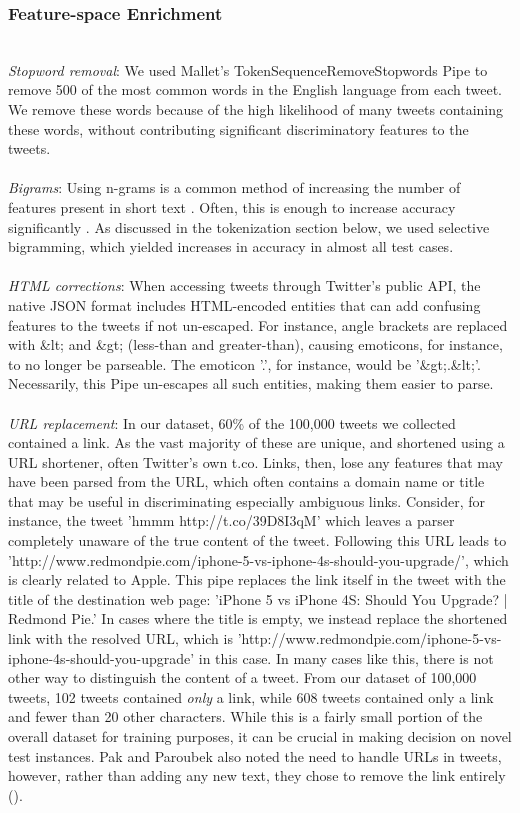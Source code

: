 \documentclass[letterpaper]{article}
\begin{document}
\subsubsection{Feature-space Enrichment} ~\\
\textit{Stopword removal}: We used Mallet's TokenSequenceRemoveStopwords Pipe to remove 500 of the most common words in the English language from each tweet. We remove these words because of the high likelihood of many tweets containing these words, without contributing significant discriminatory features to the tweets. %
\\
~\\
\textit{Bigrams}: Using n-grams is a common method of increasing the number of features present in short text %
. Often, this is enough to increase accuracy significantly%
. As discussed in the tokenization section below, we used selective bigramming, which yielded increases in accuracy in almost all test cases.\\
~\\
\textit{HTML corrections}: When accessing tweets through Twitter's public API, the native JSON format includes HTML-encoded entities that can add confusing features to the tweets if not un-escaped. For instance, angle brackets are replaced with \&lt; and \&gt; (less-than and greater-than), causing emoticons, for instance, to no longer be parseable. The emoticon '\rangle.\langle', for instance, would be '\&gt;.\&lt;'. Necessarily, this Pipe un-escapes all such entities, making them easier to parse.\\
~\\
\textit{URL replacement}: In our dataset, 60\% of the 100,000 tweets we collected contained a link. As the vast majority of these are unique, and shortened using a URL shortener, often Twitter's own t.co. Links, then, lose any features that may have been parsed from the URL, which often contains a domain name or title that may be useful in discriminating especially ambiguous links. Consider, for instance, the tweet 'hmmm http://t.co/39D8I3qM' which leaves a parser completely unaware of the true content of the tweet. Following this URL leads to 'http://www.redmondpie.com/iphone-5-vs-iphone-4s-should-you-upgrade/', which is clearly related to Apple. This pipe replaces the link itself in the tweet with the title of the destination web page: 'iPhone 5 vs iPhone 4S: Should You Upgrade? | Redmond Pie.' In cases where the title is empty, we instead replace the shortened link with the resolved URL, which is 'http://www.redmondpie.com/iphone-5-vs-iphone-4s-should-you-upgrade' in this case. In many cases like this, there is not other way to distinguish the content of a tweet. From our dataset of 100,000 tweets, 102 tweets contained \textit{only} a link, while 608 tweets contained only a link and fewer than 20 other characters. While this is a fairly small portion of the overall dataset for training purposes, it can be crucial in making decision on novel test instances. Pak and Paroubek also noted the need to handle URLs in tweets, however, rather than adding any new text, they chose to remove the link entirely  (\citeauthor{Alexander Pak and Patrick Paroubek}).
\end{document}
